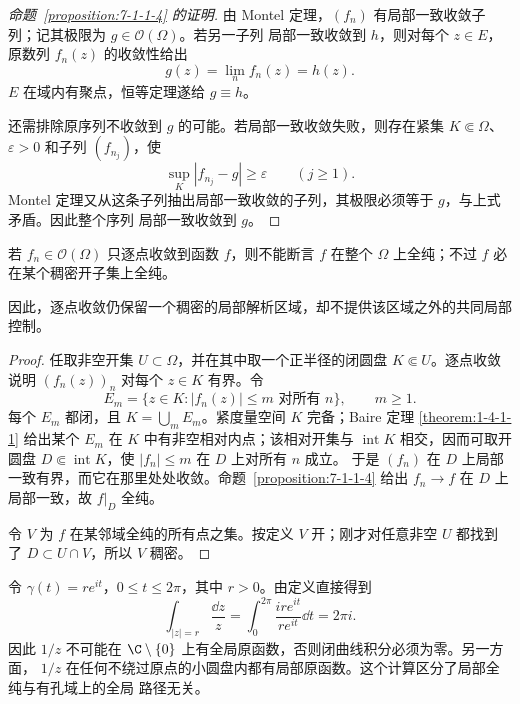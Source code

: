 \begin{proof}[命题~\ref{proposition:7-1-1-4} 的证明]
由 Montel 定理，$(f_n)$ 有局部一致收敛子列；记其极限为 $g\in\mathcal O(\Omega)$。若另一子列
局部一致收敛到 $h$，则对每个 $z\in E$，原数列 $f_n(z)$ 的收敛性给出
\[
 g(z)=\lim_nf_n(z)=h(z).
\]
$E$ 在域内有聚点，恒等定理遂给 $g\equiv h$。

还需排除原序列不收敛到 $g$ 的可能。若局部一致收敛失败，则存在紧集 $K\Subset\Omega$、
$\varepsilon>0$ 和子列 $(f_{n_j})$，使
\[
 \sup_K|f_{n_j}-g|\ge\varepsilon\qquad(j\ge1).
\]
Montel 定理又从这条子列抽出局部一致收敛的子列，其极限必须等于 $g$，与上式矛盾。因此整个序列
局部一致收敛到 $g$。
\end{proof}

\begin{theorem}[Osgood 定理（选读）]\label{theorem:7-1-2-osgood}
若 $f_n\in\mathcal O(\Omega)$ 只逐点收敛到函数 $f$，则不能断言 $f$ 在整个 $\Omega$ 上全纯；不过
$f$ 必在某个稠密开子集上全纯。
\end{theorem}

因此，逐点收敛仍保留一个稠密的局部解析区域，却不提供该区域之外的共同局部控制。

\begin{proof}
任取非空开集 $U\subset\Omega$，并在其中取一个正半径的闭圆盘 $K\Subset U$。逐点收敛说明
$(f_n(z))_n$ 对每个 $z\in K$ 有界。令
\[
 E_m=\{z\in K:|f_n(z)|\le m\text{ 对所有 }n\},\qquad m\ge1.
\]
每个 $E_m$ 都闭，且 $K=\bigcup_mE_m$。紧度量空间 $K$ 完备；Baire 定理
\ref{theorem:1-4-1-1} 给出某个 $E_m$ 在 $K$
中有非空相对内点；该相对开集与 $\operatorname{int}K$ 相交，因而可取开圆盘
$D\Subset\operatorname{int}K$，使 $|f_n|\le m$ 在 $D$ 上对所有 $n$ 成立。
于是 $(f_n)$ 在 $D$ 上局部一致有界，而它在那里处处收敛。命题~\ref{proposition:7-1-1-4} 给出
$f_n\to f$ 在 $D$ 上局部一致，故 $f|_D$ 全纯。

令 $V$ 为 $f$ 在某邻域全纯的所有点之集。按定义 $V$ 开；刚才对任意非空 $U$ 都找到了
$D\subset U\cap V$，所以 $V$ 稠密。
\end{proof}

\begin{example}[绕原点积分]\label{ex:7-1-2-1}
令 $\gamma(t)=re^{it}$，$0\le t\le2\pi$，其中 $r>0$。由定义直接得到
\[
 \int_{|z|=r}\frac{\dd z}{z}
 =\int_0^{2\pi}\frac{ire^{it}}{re^{it}}\dd t
 =2\pi i.
\]
因此 $1/z$ 不可能在 $\C\setminus\{0\}$ 上有全局原函数，否则闭曲线积分必须为零。另一方面，
$1/z$ 在任何不绕过原点的小圆盘内都有局部原函数。这个计算区分了局部全纯与有孔域上的全局
路径无关。
\end{example}

